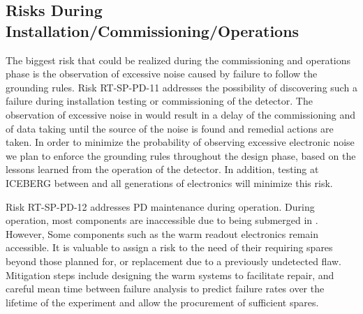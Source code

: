 \subsection{Risks During Installation/Commissioning/Operations}

The biggest risk that could be realized during the commissioning and operations phase is
the observation of excessive noise caused by failure to follow the 
grounding rules.  Risk RT-SP-PD-11 addresses the possibility of discovering such a failure during installation  testing or commissioning of the detector.  The observation of excessive noise in 
would result in a delay of the commissioning and of data taking until the source of the noise is
found and remedial actions are taken. In order to minimize the probability of observing excessive
electronic noise we plan to enforce the grounding rules throughout the design phase, based on
the lessons learned from the operation of the  detector.  In addition, testing at ICEBERG between  and all generations of  electronics will minimize this risk.  

Risk RT-SP-PD-12 addresses PD maintenance during operation.   During operation, most  components are inaccessible due to being submerged in .  However, Some components such as the warm readout electronics remain accessible. It is valuable to assign a risk to the need of their requiring spares beyond those planned for, or replacement due to a previously undetected flaw.  Mitigation steps include designing the warm systems to facilitate repair, and careful mean time between failure analysis to predict failure rates over the lifetime of the experiment and allow the procurement of sufficient spares.